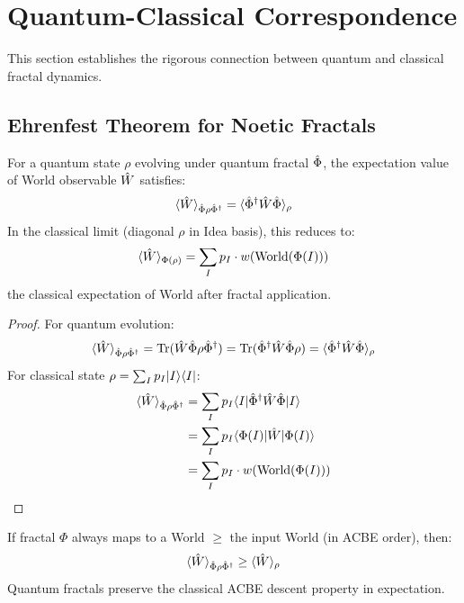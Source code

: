 \section{Quantum-Classical Correspondence}
\label{sec:quantum-classical-correspondence}

This section establishes the rigorous connection between quantum and classical fractal dynamics.

\subsection{Ehrenfest Theorem for Noetic Fractals}

\begin{theorem}
\label{thm:noetic-ehrenfest}
For a quantum state $\rho$ evolving under quantum fractal $\hat{\Phi}$, the expectation value of World observable $\hat{W}$ satisfies:
\[
\langle \hat{W} \rangle_{\hat{\Phi}\rho\hat{\Phi}^\dagger} = \langle \hat{\Phi}^\dagger \hat{W} \hat{\Phi} \rangle_\rho
\]
In the classical limit (diagonal $\rho$ in Idea basis), this reduces to:
\[
\langle \hat{W} \rangle_{\Phi(\rho)} = \sum_I p_I \cdot w(\mathrm{World}(\Phi(I)))
\]
the classical expectation of World after fractal application.
\end{theorem}

\begin{proof}
For quantum evolution:
\[
\langle \hat{W} \rangle_{\hat{\Phi}\rho\hat{\Phi}^\dagger} = \mathrm{Tr}(\hat{W} \hat{\Phi} \rho \hat{\Phi}^\dagger) = \mathrm{Tr}(\hat{\Phi}^\dagger \hat{W} \hat{\Phi} \rho) = \langle \hat{\Phi}^\dagger \hat{W} \hat{\Phi} \rangle_\rho
\]
For classical state $\rho = \sum_I p_I |I\rangle\langle I|$:
\begin{align*}
\langle \hat{W} \rangle_{\hat{\Phi}\rho\hat{\Phi}^\dagger} &= \sum_I p_I \langle I|\hat{\Phi}^\dagger \hat{W} \hat{\Phi}|I\rangle \\
&= \sum_I p_I \langle \Phi(I)|\hat{W}|\Phi(I)\rangle \\
&= \sum_I p_I \cdot w(\mathrm{World}(\Phi(I)))
\end{align*}
\end{proof}

\begin{corollary}
\label{cor:world-descent}
If fractal $\Phi$ always maps to a World $\geq$ the input World (in ACBE order), then:
\[
\langle \hat{W} \rangle_{\hat{\Phi}\rho\hat{\Phi}^\dagger} \geq \langle \hat{W} \rangle_\rho
\]
Quantum fractals preserve the classical ACBE descent property in expectation.
\end{corollary}

